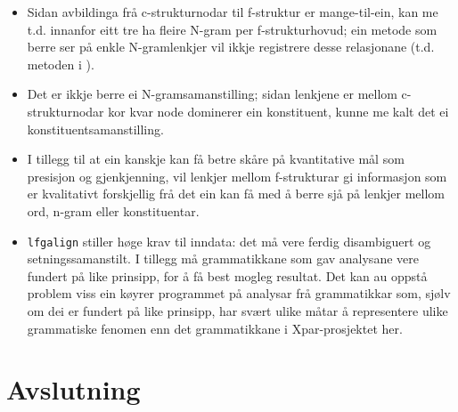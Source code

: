 \documentclass[11pt,a4paper,oneside,draft]{book}
\begin{document}
\begin{itemize}
\item Sidan avbildinga frå c-strukturnodar til f-struktur er
   mange-til-ein, kan me t.d. innanfor eitt tre ha fleire N-gram per
   f-strukturhovud; ein metode som berre ser på enkle N-gramlenkjer
   vil ikkje registrere desse relasjonane (t.d. metoden i
   \citet{samuelsson2007apa}).
\item Det er ikkje berre ei N-gramsamanstilling; sidan
   lenkjene er mellom c-strukturnodar kor kvar node dominerer ein
   konstituent, kunne me kalt det ei konstituentsamanstilling.
\item I tillegg til at ein kanskje kan få betre skåre på kvantitative mål
   som presisjon og gjenkjenning, vil lenkjer mellom f-strukturar gi
   informasjon som er kvalitativt forskjellig frå det ein kan få med å
   berre sjå på lenkjer mellom ord, n-gram eller konstituentar.
\item \texttt{lfgalign} stiller høge krav til inndata: det må vere ferdig
   disambiguert og setningssamanstilt. I tillegg må grammatikkane som
   gav analysane vere fundert på like prinsipp, for å få best mogleg
   resultat. Det kan au oppstå problem viss ein køyrer programmet på
   analysar frå grammatikkar som, sjølv om dei er fundert på like
   prinsipp, har svært ulike måtar å representere ulike grammatiske
   fenomen enn det grammatikkane i Xpar-prosjektet her.
\end{itemize}
\chapter{Avslutning}
\label{sec-6}




\end{document}
